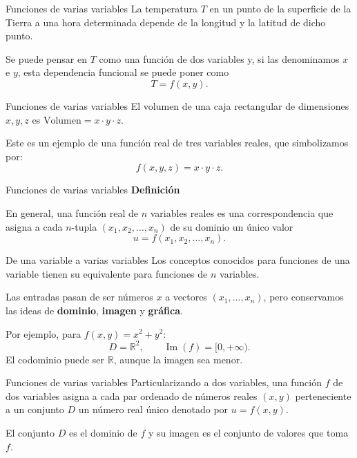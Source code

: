 \documentclass[main.tex]{subfiles}
\begin{document}
\begin{frame}{Funciones de varias variables}
La temperatura $T$ en un punto de la superficie de la Tierra a una hora determinada depende de la longitud y la latitud de dicho punto.
\medskip

Se puede pensar en $T$ como una función de dos variables y, si las denominamos $x$ e $y$, esta dependencia funcional se puede poner como
\[T=f(x,y).\]
\end{frame}
\begin{frame}{Funciones de varias variables}
El volumen de una caja rectangular de dimensiones $x,y,z$ es $\text{Volumen}=x\cdot y\cdot z$.
\medskip

Este es un ejemplo de una función real de tres variables reales, que simbolizamos por:
\[f(x,y,z)=x\cdot y\cdot z.\]
\end{frame}
\begin{frame}{Funciones de varias variables}
\textbf{Definición}
\medskip

En general, una función real de $n$ variables reales es una correspondencia que asigna a cada $n$-tupla $(x_1,x_2,\ldots,x_n)$ de su dominio un único valor
\[u=f(x_1,x_2,\ldots,x_n).\]
\end{frame}
\begin{frame}{De una variable a varias variables}
Los conceptos conocidos para funciones de una variable tienen su equivalente para funciones de $n$ variables.
\medskip

Las entradas pasan de ser números $x$ a vectores
$(x_1,\ldots,x_n)$, pero conservamos las ideas de
\textbf{dominio}, \textbf{imagen} y \textbf{gráfica}.
\medskip

Por ejemplo, para $f(x,y)=x^2+y^2$:
\[
D=\mathbb R^2,\qquad \operatorname{Im}(f)=[0,+\infty).
\]
El codominio puede ser $\mathbb R$, aunque la imagen sea menor.
\end{frame}
\begin{frame}{Funciones de varias variables}
Particularizando a dos variables, una función $f$ de dos variables asigna a cada par ordenado de números reales $(x,y)$ perteneciente a un conjunto $D$ un número real único denotado por $u=f(x,y)$.
\medskip

El conjunto $D$ es el dominio de $f$ y su imagen es el conjunto de valores que toma $f$.
\end{frame}
\end{document}
